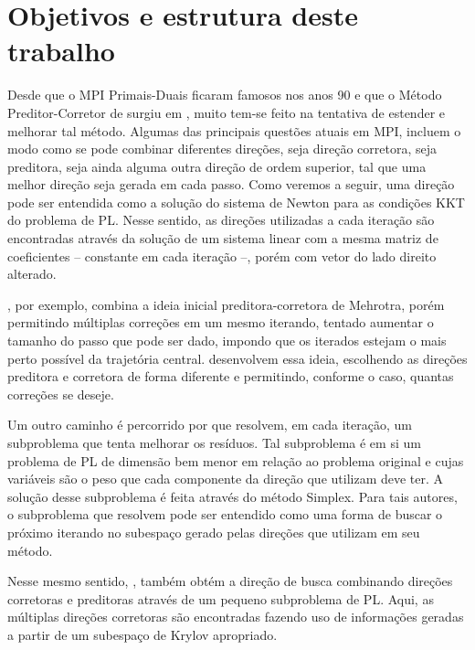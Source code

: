 


\section*{Objetivos e estrutura deste trabalho}




Desde que o   \acf{MPI} Primais-Duais ficaram famosos nos anos 90 e que o Método Preditor-Corretor de \textcite{Mehrotra:1992wr} surgiu em \citeyear{Mehrotra:1992wr}, muito tem-se feito na tentativa de estender e melhorar tal método. Algumas das principais questões atuais em \ac{MPI}, incluem o modo como se pode combinar diferentes direções, seja direção corretora, seja preditora, seja ainda alguma outra direção de  ordem superior, tal que uma melhor direção seja gerada em cada passo.  Como veremos a seguir, uma direção pode ser entendida como a solução do sistema de Newton para as condições KKT do problema de  \ac{PL}. Nesse sentido, as direções utilizadas a cada iteração são encontradas através da solução de um sistema linear com a mesma matriz de coeficientes  -- constante em cada iteração --, porém com vetor do lado direito alterado.


\textcite{Gondzio:1996uw}, por exemplo, combina a ideia inicial preditora-corretora de Mehrotra, porém permitindo múltiplas correções em um mesmo iterando, tentado aumentar o tamanho do passo que pode ser dado, impondo que os iterados estejam o mais perto possível da trajetória central. \textcite{Colombo:2008ia} desenvolvem essa ideia, escolhendo as direções preditora e corretora de forma diferente e permitindo, conforme o caso, quantas correções se deseje. 

Um outro caminho é percorrido por \textcite{Jarre:1999tl} que resolvem, em cada iteração, um subproblema que tenta melhorar os resíduos. Tal subproblema  é em si um problema de PL de dimensão bem  menor em relação ao problema original e cujas variáveis são o peso que cada componente da direção que utilizam deve ter. A solução desse subproblema é feita através do método Simplex. Para tais autores, o subproblema que resolvem pode ser entendido como uma forma de buscar o próximo iterando no subespaço gerado pelas direções que utilizam em seu método.


Nesse mesmo sentido, \textcite{Mehrotra:2005do}, também obtém a direção de busca combinando direções corretoras e preditoras  através de um pequeno subproblema de \ac{PL}. Aqui, as múltiplas  direções corretoras são encontradas fazendo uso de informações geradas a partir de um  subespaço de Krylov apropriado.



